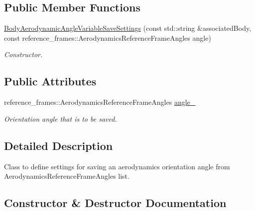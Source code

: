 \subsection*{Public Member Functions}
\begin{DoxyCompactItemize}
\item 
\hyperlink{classtudat_1_1propagators_1_1BodyAerodynamicAngleVariableSaveSettings_af24e2d196d5fd5ce718e7ffe3214b598}{Body\+Aerodynamic\+Angle\+Variable\+Save\+Settings} (const std\+::string \&associated\+Body, const reference\+\_\+frames\+::\+Aerodynamics\+Reference\+Frame\+Angles angle)
\begin{DoxyCompactList}\small\item\em Constructor. \end{DoxyCompactList}\end{DoxyCompactItemize}
\subsection*{Public Attributes}
\begin{DoxyCompactItemize}
\item 
reference\+\_\+frames\+::\+Aerodynamics\+Reference\+Frame\+Angles \hyperlink{classtudat_1_1propagators_1_1BodyAerodynamicAngleVariableSaveSettings_a79af0fa7b533d697d9e0a47574b9c7bf}{angle\+\_\+}\hypertarget{classtudat_1_1propagators_1_1BodyAerodynamicAngleVariableSaveSettings_a79af0fa7b533d697d9e0a47574b9c7bf}{}\label{classtudat_1_1propagators_1_1BodyAerodynamicAngleVariableSaveSettings_a79af0fa7b533d697d9e0a47574b9c7bf}

\begin{DoxyCompactList}\small\item\em Orientation angle that is to be saved. \end{DoxyCompactList}\end{DoxyCompactItemize}


\subsection{Detailed Description}
Class to define settings for saving an aerodynamics orientation angle from Aerodynamics\+Reference\+Frame\+Angles list. 

\subsection{Constructor \& Destructor Documentation}
